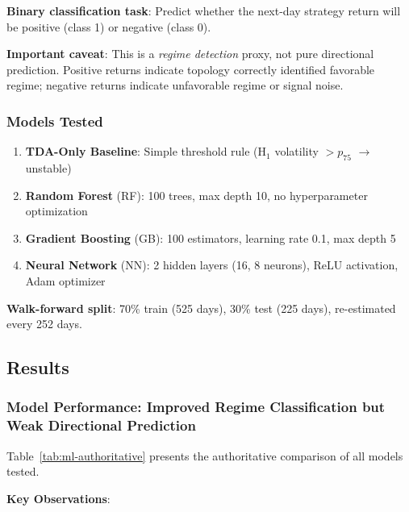 \textbf{Binary classification task}: Predict whether the next-day strategy return will be positive (class 1) or negative (class 0).

\textbf{Important caveat}: This is a \textit{regime detection} proxy, not pure directional prediction. Positive returns indicate topology correctly identified favorable regime; negative returns indicate unfavorable regime or signal noise.

\subsubsection{Models Tested}

\begin{enumerate}
    \item \textbf{TDA-Only Baseline}: Simple threshold rule (H$_1$ volatility $> p_{75}$ $\rightarrow$ unstable)
    \item \textbf{Random Forest} (RF): 100 trees, max depth 10, no hyperparameter optimization
    \item \textbf{Gradient Boosting} (GB): 100 estimators, learning rate 0.1, max depth 5
    \item \textbf{Neural Network} (NN): 2 hidden layers (16, 8 neurons), ReLU activation, Adam optimizer
\end{enumerate}

\textbf{Walk-forward split}: 70\% train (525 days), 30\% test (225 days), re-estimated every 252 days.

\subsection{Results}

\subsubsection{Model Performance: Improved Regime Classification but Weak Directional Prediction}

Table~\ref{tab:ml-authoritative} presents the authoritative comparison of all models tested.



\textbf{Key Observations}:

